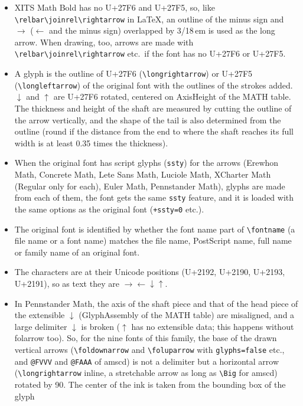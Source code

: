\documentclass[dvipdfmx,a4paper]{article}
\newcommand\pkg[1]{\textsf{#1}}
\begin{document}
\begin{itemize}
\item XITS Math Bold has no U+27F6 and U+27F5, so, like \verb|\relbar\joinrel\rightarrow| in
  \LaTeX, an outline of the minus sign and $\rightarrow$ ($\leftarrow$ and the minus sign)
  overlapped by 3/18\,em is used as the long arrow. When drawing, too, arrows are made with
  \verb|\relbar\joinrel\rightarrow| etc.\ if the font has no U+27F6 or U+27F5.
\item A glyph is the outline of U+27F6 (\verb|\longrightarrow|) or U+27F5 (\verb|\longleftarrow|)
  of the original font with the outlines of the strokes added. $\downarrow$ and $\uparrow$ are
  U+27F6 rotated, centered on AxisHeight of the MATH table. The thickness and height of the shaft
  are measured by cutting the outline of the arrow vertically, and the shape of the tail is also
  determined from the outline (round if the distance from the end to where the shaft reaches its
  full width is at least 0.35 times the thickness).
\item When the original font has script glyphs (\texttt{ssty}) for the arrows (Erewhon Math,
  Concrete Math, Lete Sans Math, Luciole Math, XCharter Math (Regular only for each), Euler Math,
  Pennstander Math), glyphs are made from each of them, the font gets the same \texttt{ssty}
  feature, and it is loaded with the same options as the original font (\verb|+ssty=0| etc.).
\item The original font is identified by whether the font name part of \verb|\fontname| (a file
  name or a font name) matches the file name, PostScript name, full name or family name of an
  original font.
\item The characters are at their Unicode positions (U+2192, U+2190, U+2193, U+2191), so as text
  they are $\rightarrow\leftarrow\downarrow\uparrow$.
\item In Pennstander Math, the axis of the shaft piece and that of the head piece of the
  extensible $\downarrow$ (GlyphAssembly of the MATH table) are misaligned, and a large delimiter
  $\downarrow$ is broken ($\uparrow$ has no extensible data; this happens without \pkg{folarrow}
  too). So, for the nine fonts of this family, the base of the drawn vertical arrows
  (\verb|\foldownarrow| and \verb|\foluparrow| with \verb|glyphs=false| etc., and \verb|@FVVV| and
  \verb|@FAAA| of \pkg{amscd}) is not a delimiter but a horizontal arrow
  (\verb|\longrightarrow| inline, a stretchable arrow as long as \verb|\Big| for \pkg{amscd})
  rotated by 90\textdegree. The center of the ink is taken from the bounding box of the glyph

\end{itemize}
\end{document}
